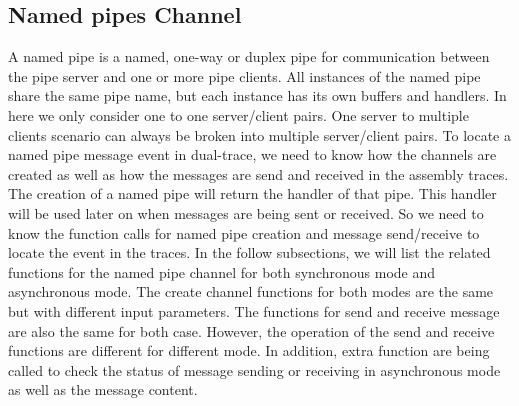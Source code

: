 \subsection{Named pipes Channel}
A named pipe is a named, one-way or duplex pipe for communication between the pipe server and one or more pipe clients. All instances of the named pipe share the same pipe name, but each instance has its own buffers and handlers. In here we only consider one to one server/client pairs. One server to multiple clients scenario can always be broken into multiple server/client pairs. To locate a named pipe message event in dual-trace, we need to know how the channels are created as well as how the messages are send and received in the assembly traces. The creation of a named pipe will return the handler of that pipe. This handler will be used later on when messages are being sent or received. So we need to know the function calls for named pipe creation and message send/receive to locate the event in the traces. In the follow subsections, we will list the related functions for the named pipe channel for both synchronous mode and asynchronous mode. The create channel functions for both modes are the same but with different input parameters. The functions for send and receive message are also the same for both case. However, the operation of the send and receive functions are different for different mode. In addition, extra function are being called to check the status of message sending or receiving in asynchronous mode as well as the message content.

